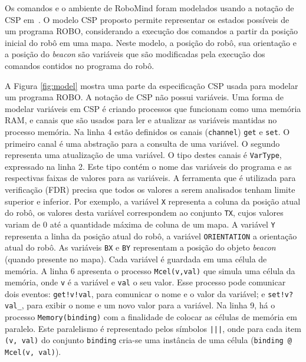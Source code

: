 Os comandos e o ambiente de RoboMind foram modelados usando a notação de CSP em~\cite{nogueira}. O modelo CSP proposto permite representar os estados possíveis de um programa ROBO, considerando a execução dos comandos a partir da posição inicial do robô em uma mapa. Neste modelo, a posição do robô, sua orientação e a posição do \textit{beacon} são variáveis que são modificadas pela execução dos comandos contidos no programa do robô.

A Figura \ref{fig:model} mostra uma parte da especificação CSP usada para modelar um programa ROBO. A notação de CSP não possui variáveis. Uma forma de modelar variáveis em CSP é criando processos que funcionam como uma memória RAM, e canais que são usados para ler e atualizar as variáveis mantidas no processo memória. Na linha 4 estão definidos os canais (\texttt{channel}) \texttt{get} e \texttt{set}. O primeiro canal é uma abstração para a consulta de uma variável. O segundo representa uma atualização de uma variável. O tipo destes canais é \texttt{VarType}, expressado na linha 2. Este tipo contém o nome das variáveis do programa e as respectivas faixas de valores para as variáveis. A ferramenta que é utilizada para verificação (FDR) precisa que todos os valores a serem analisados tenham limite superior e inferior. Por exemplo, a variável \texttt{X} representa a coluna da posição atual do robô, os valores desta variável correspondem ao conjunto \texttt{TX}, cujos valores variam de 0 até a quantidade máxima de coluna de um mapa. A variável \texttt{Y} representa a linha da posição atual do robô, a variável \texttt{ORIENTATION} a orientação atual do robô. As variáveis \texttt{BX} e \texttt{BY} representam a posição do objeto \textit{beacon} (quando presente no mapa). Cada variável é guardada em uma célula de memória. A linha 6 apresenta o processo \texttt{Mcel(v,val)} que simula uma célula da memória, onde \texttt{v} é a variável e \texttt{val} o seu valor. Esse processo pode comunicar dois eventos: \texttt{get!v!val}, para comunicar o nome e o valor da variável; e \texttt{set!v?val\_}, para exibir o nome e um novo valor para a variável. Na linha 9, há o processo \texttt{Memory(binding)} com a finalidade de colocar as células de memória em paralelo. Este paralelismo é representado pelos símbolos \texttt{|||}, onde para cada item \texttt{(v, val)} do conjunto \texttt{binding} cria-se uma instância de uma célula (\texttt{binding @ Mcel(v, val)}).

